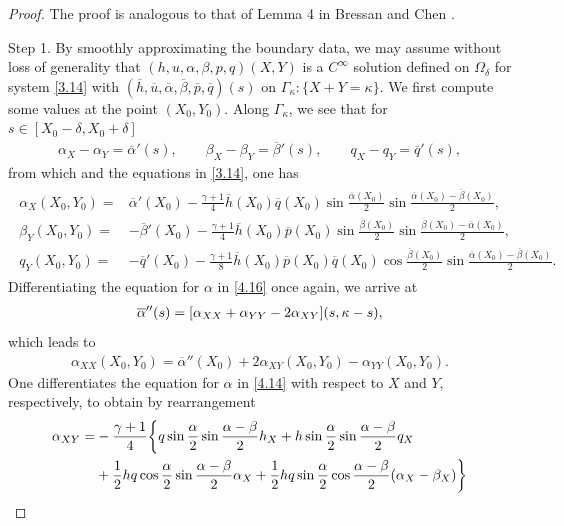 \documentclass[11pt,reqno]{article}
\newcommand{\fr}{\frac}
\numberwithin{equation}{section}
\begin{document}
\begin{proof}
The proof is analogous to that of Lemma 4 in Bressan and Chen \cite{BC1}.

Step 1. By smoothly approximating the boundary data, we may assume without loss of generality that $(h, u, \alpha, \beta, p, q)(X,Y)$ is a $C^\infty$ solution defined on $\Omega_\delta$ for system \eqref{3.14} with $(\overline{h}, \overline{u}, \overline{\alpha}, \overline{\beta}, \overline{p}, \overline{q})(s)$ on \(\Gamma_\kappa: \{X+Y=\kappa\}\). We first compute some values at the point $(X_0, Y_0)$. Along $\Gamma_\kappa$, we see that for $s\in[X_0-\delta, X_0+\delta]$
\begin{align}\label{4.16}
\alpha_X-\alpha_Y=\overline{\alpha}'(s),\qquad \beta_X-\beta_Y=\overline{\beta}'(s),\qquad q_X-q_Y=\overline{q}'(s),
\end{align}
from which and the equations in \eqref{3.14}, one has
\begin{align}\label{4.17}
\begin{split}
\alpha_X(X_0,Y_0)=&\overline{\alpha}'(X_0) - \fr{\gamma+1}{4}\overline{h}(X_0)\overline{q}(X_0) \sin\fr{\overline{\alpha}(X_0)}{2}\sin\fr{\overline{\alpha}(X_0)-\overline{\beta}(X_0)}{2}, \\
\beta_Y(X_0,Y_0)=&-\overline{\beta}'(X_0) - \fr{\gamma+1}{4}\overline{h}(X_0)\overline{p}(X_0) \sin\fr{\overline{\beta}(X_0)}{2}\sin\fr{\overline{\beta}(X_0)-\overline{\alpha}(X_0)}{2}, \\
q_Y(X_0,Y_0)=&-\overline{q}'(X_0) -\fr{\gamma+1}{8}\overline{h}(X_0)\overline{p}(X_0) \overline{q}(X_0) \cos\fr{\overline{\beta}(X_0)}{2}\sin\fr{\overline{\alpha}(X_0)-\overline{\beta}(X_0)}{2}.
\end{split}
\end{align}
Differentiating the equation for $\alpha$ in \eqref{4.16} once again, we arrive at
\begin{align}
\overline{\alpha}''(s)=[\alpha_{XX} +\alpha_{YY}-2\alpha_{XY}](s,\kappa-s), \notag
\end{align}
which leads to
\begin{align}\label{4.18}
\alpha_{XX}(X_0,Y_0)=\overline{\alpha}''(X_0)+2\alpha_{XY}(X_0,Y_0)-\alpha_{YY}(X_0,Y_0).
\end{align}
One differentiates the equation for $\alpha$ in \eqref{4.14} with respect to $X$ and $Y$, respectively, to obtain by rearrangement
\begin{align}\label{4.19}
\alpha_{XY}=& -\fr{\gamma+1}{4}\bigg\{q\sin\fr{\alpha}{2}\sin\fr{\alpha-\beta}{2}h_X +h\sin\fr{\alpha}{2}\sin\fr{\alpha-\beta}{2}q_X \notag \\ &+\fr{1}{2}hq\cos\fr{\alpha}{2}\sin\fr{\alpha-\beta}{2}\alpha_X +\fr{1}{2}hq\sin\fr{\alpha}{2}\cos\fr{\alpha-\beta}{2}(\alpha_X-\beta_X)\bigg\} \notag

\end{align}
\end{proof}
\end{document}
